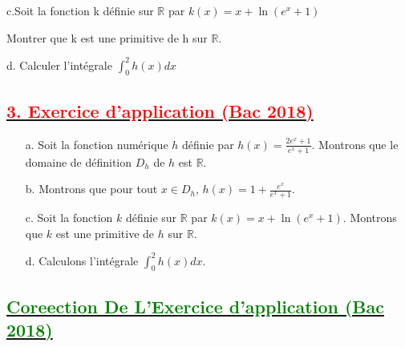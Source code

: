 \documentclass[12pt]{article}
\begin{document}
c.Soit la fonction k définie sur $\mathbb{R}$ par $k(x)=x+\ln(e^{x}+1)$

Montrer que k est une primitive de h sur $\mathbb{R}$.

d. Calculer l’intégrale $\int_{0}^{2}h(x)dx$
\subsection*{\underline{\textbf{\textcolor{red}{3. Exercice d’application (Bac 2018)}}}}

\begin{itemize}
    \item[a.] Soit la fonction numérique \( h \) définie par \( h(x) =\frac{2e^{x}+1}{e^{x}+1} \). Montrons que le domaine de définition \( D_h \) de \( h \) est \( \mathbb{R} \).
    
    \item[b.] Montrons que pour tout \( x \in D_h \), \( h(x) = 1 + \frac{e^{x}}{e^{x}+1} \).
    
    \item[c.] Soit la fonction \( k \) définie sur \( \mathbb{R} \) par \( k(x)=x+\ln(e^{x}+1) \). Montrons que \( k \) est une primitive de \( h \) sur \( \mathbb{R} \).
    
    \item[d.] Calculons l’intégrale \( \int_{0}^{2}h(x)dx \).
\end{itemize}
\subsection*{\underline{\textbf{\textcolor{green}{Coreection De L'Exercice d’application (Bac 2018)}}}}
\end{document}
